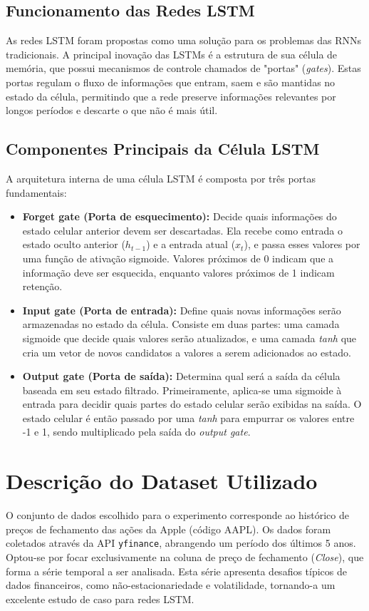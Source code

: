 \documentclass[12pt,a4paper]{article}
\begin{document}
\subsection{Funcionamento das Redes LSTM}
As redes LSTM foram propostas como uma solução para os problemas das RNNs tradicionais. A principal inovação das LSTMs é a estrutura de sua célula de memória, que possui mecanismos de controle chamados de "portas" (\textit{gates}). Estas portas regulam o fluxo de informações que entram, saem e são mantidas no estado da célula, permitindo que a rede preserve informações relevantes por longos períodos e descarte o que não é mais útil.

\subsection{Componentes Principais da Célula LSTM}
A arquitetura interna de uma célula LSTM é composta por três portas fundamentais:
\begin{itemize}
    \item \textbf{Forget gate (Porta de esquecimento):} Decide quais informações do estado celular anterior devem ser descartadas. Ela recebe como entrada o estado oculto anterior ($h_{t-1}$) e a entrada atual ($x_t$), e passa esses valores por uma função de ativação sigmoide. Valores próximos de 0 indicam que a informação deve ser esquecida, enquanto valores próximos de 1 indicam retenção.
    \item \textbf{Input gate (Porta de entrada):} Define quais novas informações serão armazenadas no estado da célula. Consiste em duas partes: uma camada sigmoide que decide quais valores serão atualizados, e uma camada \textit{tanh} que cria um vetor de novos candidatos a valores a serem adicionados ao estado.
    \item \textbf{Output gate (Porta de saída):} Determina qual será a saída da célula baseada em seu estado filtrado. Primeiramente, aplica-se uma sigmoide à entrada para decidir quais partes do estado celular serão exibidas na saída. O estado celular é então passado por uma \textit{tanh} para empurrar os valores entre -1 e 1, sendo multiplicado pela saída do \textit{output gate}.
\end{itemize}

\section{Descrição do Dataset Utilizado}
O conjunto de dados escolhido para o experimento corresponde ao histórico de preços de fechamento das ações da Apple (código AAPL). Os dados foram coletados através da API \texttt{yfinance}, abrangendo um período dos últimos 5 anos. Optou-se por focar exclusivamente na coluna de preço de fechamento (\textit{Close}), que forma a série temporal a ser analisada. Esta série apresenta desafios típicos de dados financeiros, como não-estacionariedade e volatilidade, tornando-a um excelente estudo de caso para redes LSTM.
\end{document}
